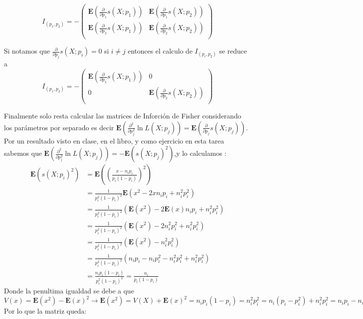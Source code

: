\documentclass[letter]{memoir} %
\begin{document}
\begin{enumerate}
\begin{enumerate}
\[
I_{(p_1,p_2)} = -
	\begin{pmatrix}
		\mathbf{E}\left(\frac{\partial  }{\partial p_1} s(X;p_1)\right) & \mathbf{E}\left( \frac{\partial  }{\partial p_1 }s(X;p_2) \right)\\
        \mathbf{E}\left(\frac{\partial  }{\partial p_2} s(X;p_1)\right)& \mathbf{E} \left(\frac{\partial  }{\partial p_2 } s(X;p_2) \right) \\
	\end{pmatrix}
\]
 
Si notamos que $\frac{\partial }{\partial p_j} s(X; p_i) = 0$ si $i\neq j$ entonces el calculo de $I_(p_i,p_2)$ se reduce a  
\[
I_{(p_1,p_2)} = -
	\begin{pmatrix}
		\mathbf{E} \left( \frac{\partial  }{\partial p_1} s(X;p_1) \right) &  0\\
        0 & \mathbf{E} \left( \frac{\partial  }{\partial p_2 } s(X;p_2) \right)\\
	\end{pmatrix}
\]

Finalmente solo resta calcular las matrices de Inforción de Fisher considerando los parámetros por separado es decir $
\mathbf{E}\left(  \frac{\partial ^2 }{ \partial p_j ^2 } \ln L(X;p_j)   \right) =\mathbf{E}\left(  \frac{\partial  }{ \partial p_j  } s(X;p_j)   \right)$. 
Por un resultado visto en clase, en el libro, y como ejercicio en esta tarea sabemos que $ \mathbf{E}\left(  \frac{\partial ^2 }{ \partial p_j ^2 } \ln L(X;p_j)   \right) = -\mathbf{E} \left( s(X;p_j) ^2\right) $,y lo calculamos :  
\[
\begin{split}
\mathbf{E} \left( s(X;p_i) ^2\right)  & = \mathbf{E} \left( \left( \frac{x-n_ip_i}{p_i(1-p_i)} \right)^2 \right) \\
 & =  \frac{1}{p_i^2(1-p_i)^2} \mathbf{E} \left( x^2-2xn_ip_i+n_i^2p_i^2\right)   \\
 & =  \frac{1}{p_i^2(1-p_i)^2}  \left( \mathbf{E}(x^2)-2\mathbf{E}(x)n_ip_i+n_i^2p_i^2\right)   \\
 & =  \frac{1}{p_i^2(1-p_i)^2}  \left( \mathbf{E}(x^2)-2n_i^2p_i^2+n_i^2p_i^2\right)   \\
 & =  \frac{1}{p_i^2(1-p_i)^2}  \left( \mathbf{E}(x^2)-n_i^2p_i^2\right)   \\
  & =  \frac{1}{p_i^2(1-p_i)^2}  \left( n_ip_i-n_ip_i^2-n_i^2p_i^2+n_i^2p_i^2\right)   \\
  &=\frac{n_ip_i(1-p_i)}{p_i^2(1-p_i)^2} = \frac{n_i}{p_i(1-p_i)}
\end{split}
\]
Donde la penultima igualdad se debe a que $V(x ) = \mathbf{E}(x^2)- \mathbf{E}(x)^2 \rightarrow  \mathbf{E}(x^2) = V(X) +\mathbf{E}(x)^2 = n_ip_i(1-p_i) = n_i^2p_i^2 =n_i(p_i-p_i^2)+n_i^2p_i^2 = n_ip_i-n_ip_i^2+n_i^2p_i^2$ \\
Por lo que la matriz queda:


\end{enumerate}
\end{enumerate}
\end{document}
